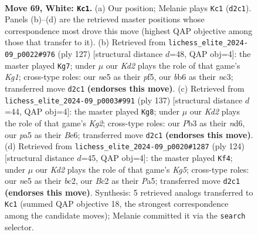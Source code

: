 \documentclass[11pt]{article}
\begin{document}
\clearpage

\begin{figure}[p]\centering
\begin{subfigure}{0.46\textwidth}\centering
\resizebox{\linewidth}{!}{%
\newchessgame
\chessboard[
  setfen={n4k2/8/1b1N4/p3n3/P2pP3/1P5p/2BKP3/8 w - - 4 69},
  showmover=false,
  pgfstyle=straightmove, color=movearrow, markmove={d2-c1}
]}
\caption{}
\end{subfigure}\hfill
\begin{subfigure}{0.46\textwidth}\centering
\resizebox{\linewidth}{!}{%
\newchessgame
\chessboard[
  setfen={6k1/4bp2/3p4/2pP1Pp1/2P5/2NK4/1B6/8 b - - 2 64},
  showmover=false,
  pgfstyle=straightmove, color=movearrow, markmove={g8-g7}
]}
\caption{}
\end{subfigure}
\\[4pt]
\begin{subfigure}{0.46\textwidth}\centering
\resizebox{\linewidth}{!}{%
\newchessgame
\chessboard[
  setfen={8/2P3k1/3Nb1p1/6P1/p4P1p/Bp3K2/8/8 b - - 4 69},
  showmover=false,
  pgfstyle=straightmove, color=movearrow, markmove={g7-g8}
]}
\caption{}
\end{subfigure}\hfill
\begin{subfigure}{0.46\textwidth}\centering
\resizebox{\linewidth}{!}{%
\newchessgame
\chessboard[
  setfen={8/6Bp/p3k2P/Pp1p2K1/3P4/2P5/2b5/8 w - - 24 63},
  showmover=false,
  pgfstyle=straightmove, color=movearrow, markmove={g5-f4}
]}
\caption{}
\end{subfigure}
\caption{\textbf{Move 69, White: \texttt{Kc1}.} (a) Our position; Melanie plays \texttt{Kc1} (\texttt{d2c1}). Panels (b)--(d) are the retrieved master positions whose correspondence most drove this move (highest QAP objective among those that transfer to it). (b) Retrieved from \texttt{lichess\_elite\_2024-09\_p0022\#976} (ply 127) [structural distance $d$=48, QAP obj=4]: the master played \texttt{Kg7}; under $\mu$ our \emph{Kd2} plays the role of that game's \emph{Kg1}; cross-type roles: our \emph{n}e5 as their \emph{p}f5, our \emph{b}b6 as their \emph{n}c3; transferred move \texttt{d2c1} \textbf{(endorses this move)}. (c) Retrieved from \texttt{lichess\_elite\_2024-09\_p0003\#991} (ply 137) [structural distance $d$=44, QAP obj=4]: the master played \texttt{Kg8}; under $\mu$ our \emph{Kd2} plays the role of that game's \emph{Kg2}; cross-type roles: our \emph{P}b3 as their \emph{n}d6, our \emph{p}a5 as their \emph{B}e6; transferred move \texttt{d2c1} \textbf{(endorses this move)}. (d) Retrieved from \texttt{lichess\_elite\_2024-09\_p0020\#1287} (ply 124) [structural distance $d$=45, QAP obj=4]: the master played \texttt{Kf4}; under $\mu$ our \emph{Kd2} plays the role of that game's \emph{Kg5}; cross-type roles: our \emph{n}e5 as their \emph{b}c2, our \emph{B}c2 as their \emph{P}a5; transferred move \texttt{d2c1} \textbf{(endorses this move)}. Synthesis: 5 retrieved analogs transferred to \texttt{Kc1} (summed QAP objective 18, the strongest correspondence among the candidate moves); Melanie committed it via the \texttt{search} selector.}
\label{fig:thought-m136}
\end{figure}
\end{document}
